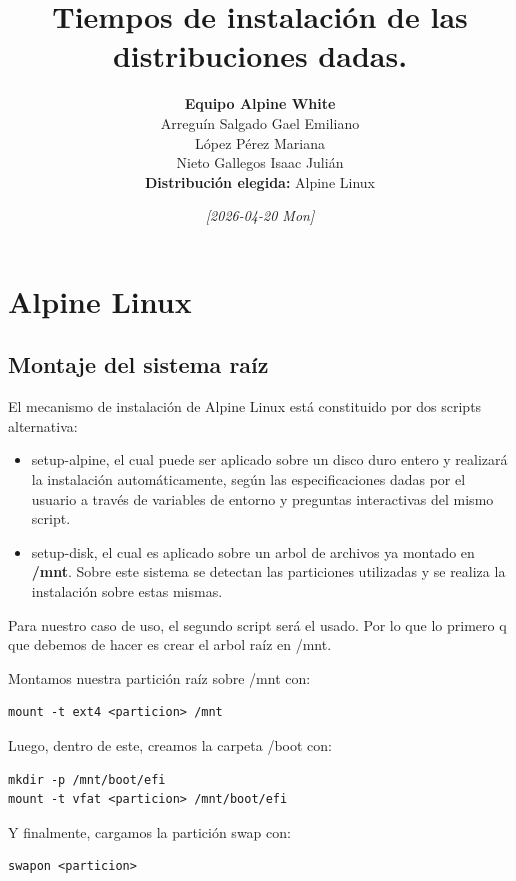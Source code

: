 \documentclass[11pt, letterpaper]{article}
\author{
\textbf{Equipo Alpine White} \\[0.5em]
Arreguín Salgado Gael Emiliano \\
López Pérez Mariana \\
Nieto Gallegos Isaac Julián\\
\textbf{Distribución elegida:} Alpine Linux
}
\date{\textit{{[}2026-04-20 Mon]}}
\title{Tiempos de instalación de las distribuciones dadas.}
\begin{document}
\maketitle

\tableofcontents

\newpage
\section{Alpine Linux}
\label{sec:org07e84c6}

\subsection{Montaje del sistema raíz}
\label{sec:org48f8db4}

El mecanismo de instalación de Alpine Linux está constituido por dos scripts alternativa:

\begin{itemize}
\item setup-alpine, el cual puede ser aplicado sobre un disco duro entero y realizará la instalación automáticamente, según las especificaciones dadas por el usuario a través de variables de entorno y preguntas interactivas del mismo script.

\item setup-disk, el cual es aplicado sobre un arbol de archivos ya montado en \textbf{/mnt}. Sobre este sistema se detectan las particiones utilizadas y se realiza la instalación sobre estas mismas.
\end{itemize}

Para nuestro caso de uso, el segundo script será el usado. Por lo que lo primero q que debemos de hacer es crear el arbol raíz en /mnt.

Montamos nuestra partición raíz sobre /mnt con:

\begin{verbatim}
mount -t ext4 <particion> /mnt
\end{verbatim}

Luego, dentro de este, creamos la carpeta /boot con:

\begin{verbatim}
mkdir -p /mnt/boot/efi
mount -t vfat <particion> /mnt/boot/efi
\end{verbatim}

Y finalmente, cargamos la partición swap con:

\begin{verbatim}
swapon <particion>
\end{verbatim}
\end{document}
